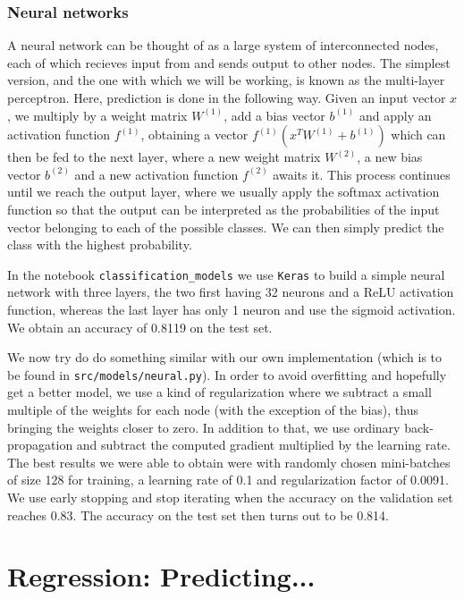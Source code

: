 \documentclass{article}
\begin{document}
\subsubsection{Neural networks}
A neural network can be thought of as a large system of interconnected nodes, each of which recieves input from and sends output to other nodes. The simplest version, and the one with which we will be working, is known as the multi-layer perceptron. Here, prediction is done in the following way. Given an input vector $x$, we multiply by a weight matrix $W^{(1)}$, add a bias vector $b^{(1)}$ and apply an activation function $f^{(1)}$, obtaining a vector $f^{(1)}(x^T W^{(1)} + b^{(1)})$ which can then be fed to the next layer, where a new weight matrix $W^{(2)}$, a new bias vector $b^{(2)}$ and a new activation function $f^{(2)}$ awaits it. This process continues until we reach the output layer, where we usually apply the softmax activation function so that the output can be interpreted as the probabilities of the input vector belonging to each of the possible classes. We can then simply predict the class with the highest probability.

In the notebook \texttt{classification\_models} we use \texttt{Keras} to build a simple neural network with three layers, the two first having 32 neurons and a ReLU activation function, whereas the last layer has only 1 neuron and use the sigmoid activation. We obtain an accuracy of 0.8119 on the test set.

We now try do do something similar with our own implementation (which is to be found in \texttt{src/models/neural.py}). In order to avoid overfitting and hopefully get a better model, we use a kind of regularization where we subtract a small multiple of the weights for each node (with the exception of the bias), thus bringing the weights closer to zero. In addition to that, we use ordinary back-propagation and subtract the computed gradient multiplied by the learning rate. The best results we were able to obtain were with randomly chosen mini-batches of size 128 for training, a learning rate of 0.1 and regularization factor of 0.0091. We use early stopping and stop iterating when the accuracy on the validation set reaches 0.83. The accuracy on the test set then turns out to be 0.814.

\section{Regression: Predicting...}
\end{document}
